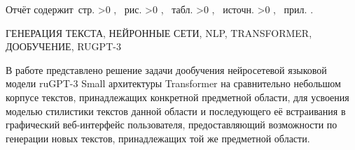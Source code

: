 \Referat

Отчёт содержит \pageref{LastPage}\,стр.%
\ifnum \totfig >0
, \totfig~рис.%
\fi
\ifnum \tottab >0
, \tottab~табл.%
\fi
%
\ifnum \totbib >0
, \totbib~источн.%
\fi
%
\ifnum \totapp >0
, \totapp~прил.%
\else
.%
\fi

ГЕНЕРАЦИЯ ТЕКСТА, НЕЙРОННЫЕ СЕТИ, NLP, TRANSFORMER, ДООБУЧЕНИЕ, RUGPT-3

В работе представлено решение задачи дообучения нейросетевой языковой модели ruGPT-3 Small архитектуры Transformer на сравнительно небольшом корпусе текстов, принадлежащих конкретной предметной области, для усвоения моделью стилистики текстов данной области и последующего её встраивания в графический веб-интерфейс пользователя, предоставляющий возможности по генерации новых текстов, принадлежащих той же предметной области.
